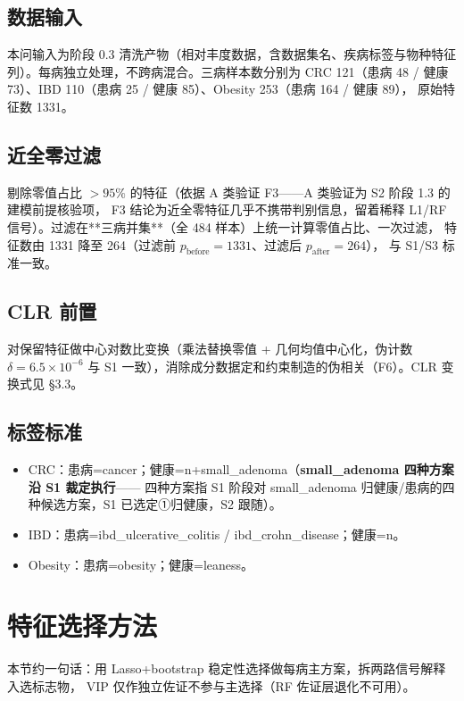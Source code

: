 \documentclass{internal-report}
\begin{document}
\subsection{数据输入}
本问输入为阶段 0.3 清洗产物（相对丰度数据，含数据集名、疾病标签与物种特征列）。每病独立处理，不跨病混合。三病样本数分别为
CRC 121（患病 48 / 健康 73）、IBD 110（患病 25 / 健康 85）、Obesity 253（患病 164 / 健康 89），
原始特征数 1331。

\subsection{近全零过滤}
剔除零值占比 $>95\%$ 的特征（依据 A 类验证 F3——A 类验证为 S2 阶段 1.3 的建模前提核验项，
F3 结论为近全零特征几乎不携带判别信息，留着稀释 L1/RF 信号）。过滤在**三病并集**（全 484 样本）上统一计算零值占比、一次过滤，
特征数由 1331 降至 264（过滤前 $p_\mathrm{before}=1331$、过滤后 $p_\mathrm{after}=264$），
与 S1/S3 标准一致。

\subsection{CLR 前置}
对保留特征做中心对数比变换（乘法替换零值 + 几何均值中心化，伪计数 $\delta=6.5\times10^{-6}$
与 S1 一致），消除成分数据定和约束制造的伪相关（F6）。CLR 变换式见 §3.3。

\subsection{标签标准}
\begin{itemize}
  \item CRC：患病=cancer；健康=n+small\_adenoma（\textbf{small\_adenoma 四种方案沿 S1 裁定执行}——
        四种方案指 S1 阶段对 small\_adenoma 归健康/患病的四种候选方案，S1 已选定①归健康，S2 跟随）。
  \item IBD：患病=ibd\_ulcerative\_colitis / ibd\_crohn\_disease；健康=n。
  \item Obesity：患病=obesity；健康=leaness。
\end{itemize}

\section{特征选择方法}
本节约一句话：用 Lasso+bootstrap 稳定性选择做每病主方案，拆两路信号解释入选标志物，
VIP 仅作独立佐证不参与主选择（RF 佐证层退化不可用）。
\end{document}
